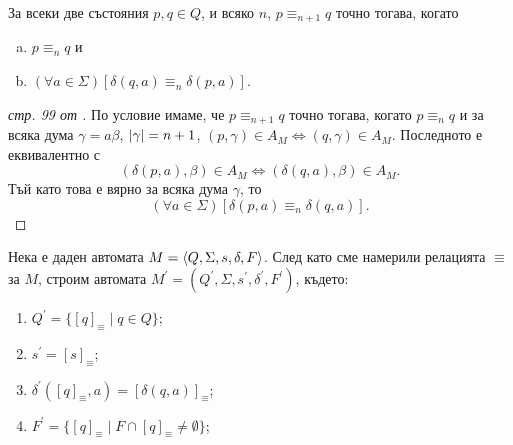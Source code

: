 \begin{prop}
  За всеки две състояния $p,q \in Q$, и всяко $n$, $p \equiv_{n+1} q$ точно тогава, когато
  \begin{enumerate}[a)]
  \item
    $p \equiv_{n} q$ и
  \item
    $(\forall a \in \Sigma)[\delta(q,a) \equiv_{n} \delta(p,a)]$.
  \end{enumerate}
\end{prop}
\begin{proof}[стр. 99 от \cite{papadimitriou}]
  По условие имаме, че $p\equiv_{n+1} q$ точно тогава, когато
  $p\equiv_n q$ и за всяка дума $\gamma = a\beta$, $\vert{\gamma}\vert = n+1$,
  $(p,\gamma) \in A_M \iff (q,\gamma)\in A_M$.
  Последното е еквивалентно с 
  \[(\delta(p,a),\beta) \in A_M \iff (\delta(q,a),\beta) \in A_M.\]
  Тъй като това е вярно за всяка дума $\gamma$, то
  \[(\forall a\in\Sigma)[\delta(p,a) \equiv_{n} \delta(q, a)].\]
  
\end{proof}

Нека е даден автомата $M = \langle{Q,\Sigma,s,\delta,F}\rangle$.
След като сме намерили релацията $\equiv$ за $M$, 
строим автомата $M^\prime = (Q^\prime,\Sigma,s^\prime,\delta^\prime,F^\prime)$, където:
\begin{enumerate}[1)]
\item
  $Q^\prime = \{[q]_\equiv \mid q\in Q\}$;
\item
  $s^\prime = [s]_\equiv$;
\item
  $\delta^\prime([q]_\equiv, a) = [\delta(q,a)]_\equiv$;
\item
  $F^\prime = \{[q]_\equiv\mid F\cap [q]_\equiv \neq \emptyset\}$;
\end{enumerate}


